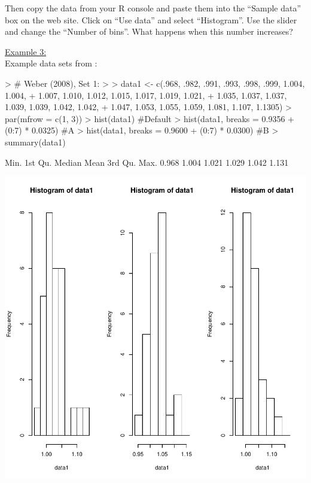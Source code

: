 \documentclass[12pt,letterpaper,final]{article}
\begin{document}
Then copy the data from your R console and paste them into the ``Sample data''
box on the web site. Click on ``Use data'' and select ``Histogram''.
Use the slider and change the ``Number of bins''. What happens when this number increases?


\newpage


\noindent
\underline{Example 3:} \\

Example data sets from \citet{Web2008}:
\begin{Schunk}
\begin{Sinput}
> # Weber (2008), Set 1:
> 
> data1 <- c(.968, .982, .991, .993, .998, .999, 1.004, 1.004,
+   1.007, 1.010, 1.012, 1.015, 1.017, 1.019, 1.021,
+   1.035, 1.037, 1.037, 1.039, 1.039, 1.042, 1.042,
+   1.047, 1.053, 1.055, 1.059, 1.081, 1.107, 1.1305)
> par(mfrow = c(1, 3))
> hist(data1) #Default
> hist(data1, breaks = 0.9356 + (0:7) * 0.0325) #A
> hist(data1, breaks = 0.9600 + (0:7) * 0.0300) #B
> summary(data1)
\end{Sinput}
\begin{Soutput}
   Min. 1st Qu.  Median    Mean 3rd Qu.    Max. 
  0.968   1.004   1.021   1.029   1.042   1.131 
\end{Soutput}
\end{Schunk}
\includegraphics{lect_main-002}
\end{document}

